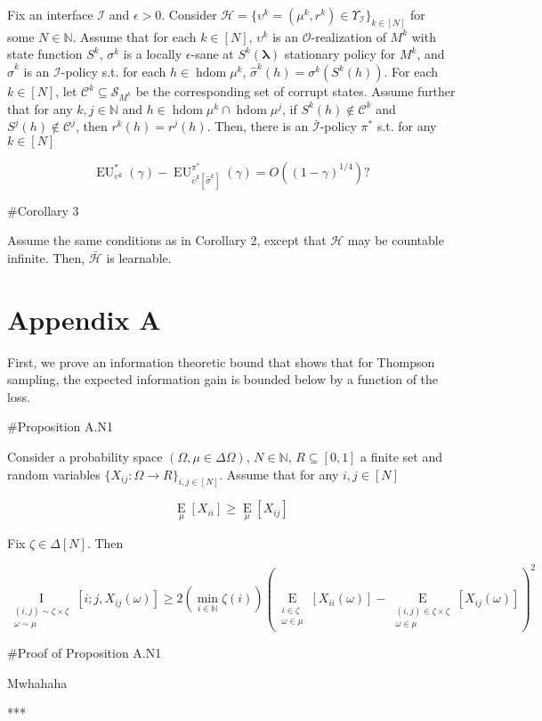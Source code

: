 \documentclass[a4paper]{article}
\newcommand{\E}[1]{\underset{#1}{\operatorname{E}}}
\newcommand{\EE}[2]{\underset{\substack{#1 \\ #2}}{\operatorname{E}}}
\newcommand{\II}[2]{\underset{\substack{#1 \\ #2}}{\operatorname{I}}}
\newcommand{\Nats}{\mathbb{N}}
\newcommand{\Estr}{\boldsymbol{\lambda}}
\newcommand{\Ob}{\mathcal{O}}
\newcommand{\St}{\mathcal{S}}
\newcommand{\In}{\mathcal{I}}
\DeclareMathOperator{\HD}{hdom}
\newcommand{\Hy}{\mathcal{H}}
\newcommand{\Co}{\mathcal{C}}
\newcommand{\EU}{\operatorname{EU}}
\begin{document}
Fix an interface $\In$ and $\epsilon > 0$. Consider $\Hy = \{\upsilon^k = (\mu^k,r^k) \in \Upsilon_{\In}\}_{k \in [N]}$ for some $N \in \Nats$. Assume that for each $k \in [N]$, $\upsilon^k$ is an $\Ob$-realization of $M^k$ with state function $S^k$, $\sigma^k$ is a locally $\epsilon$-sane at $S^k(\Estr)$ stationary policy for $M^k$, and $\hat{\sigma}^k$ is an $\In$-policy s.t. for each $h \in \HD{\mu^k}$, $\hat{\sigma}^k(h)=\sigma^k\left(S^k(h)\right)$. For each $k \in [N]$, let $\Co^k \subseteq \St_{M^k}$ be the corresponding set of corrupt states. Assume further that for any $k,j \in \Nats$ and $h \in \HD{\mu^k} \cap \HD{\mu^j}$, if $S^k(h) \not\in \Co^k$ and $S^j(h) \not\in \Co^j$, then $r^k(h)=r^j(h)$. Then, there is an $\bar{\In}$-policy $\pi^*$ s.t. for any $k \in [N]$

$$\EU_{\upsilon^k}^*(\gamma) - \EU_{\bar{\upsilon}^k\left[\hat{\sigma}^k\right]}^{\pi^*}(\gamma) = O\left((1-\gamma)^{1/4}\right)?$$

\#Corollary 3

Assume the same conditions as in Corollary 2, except that $\Hy$ may be countable infinite. Then, $\bar{\Hy}$ is learnable.

\section{Appendix A}

First, we prove an information theoretic bound that shows that for Thompson sampling, the expected information gain is bounded below by a function of the loss.

\#Proposition A.N1

Consider a probability space $(\Omega, \mu \in \Delta\Omega)$, $N \in \Nats$, $R \subseteq [0,1]$ a finite set and random variables $\{X_{ij}: \Omega \rightarrow R\}_{i,j \in [N]}$. Assume that for any $i,j \in [N]$ 

$$\E{\mu}\left[X_{ii}\right] \geq \E{\mu}\left[X_{ij}\right]$$ 

Fix $\zeta \in \Delta[N]$. Then

$$\II{(i,j)\sim\zeta\times\zeta}{\omega\sim\mu}\left[i;j,X_{ij}(\omega)\right] \geq 2 \left(\min_{i \in \Nats} {\zeta(i)}\right) \left(\EE{i \in \zeta}{\omega \in \mu}\left[X_{ii}(\omega)\right]-\EE{(i,j) \in \zeta \times \zeta}{\omega \in \mu}\left[X_{ij}(\omega)\right]\right)^2$$

\#Proof of Proposition A.N1

Mwhahaha

***
\end{document}
